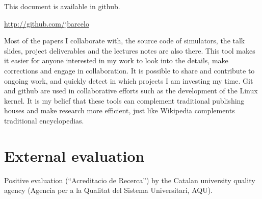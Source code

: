 \documentclass[a4paper,twocolumns]{article}%
\begin{document}
This document is available in github.

\url{http://github.com/jbarcelo}

Most of the papers I collaborate with, the source code of simulators, the talk slides, project deliverables and the lectures notes are also there.
This tool makes it easier for anyone interested in my work to look into the details, make corrections and engage in collaboration.
It is possible to share and contribute to ongoing work, and quickly detect in which projects I am investing my time.
Git and github are used in collaborative efforts such as the development of the Linux kernel.
It is my belief that these tools can complement traditional publishing houses and make research more efficient, just like Wikipedia complements traditional encyclopedias. 

\section{External evaluation}

Positive evaluation (``Acreditacio de Recerca'') by the Catalan university quality agency (Agencia per a la Qualitat del Sistema Universitari, AQU).




\end{document}
